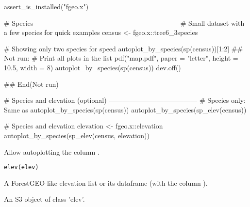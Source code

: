 \documentclass[a4paper]{book}
\begin{document}
%
\begin{Examples}
\begin{ExampleCode}
assert_is_installed("fgeo.x")

# Species ---------------------------------------------------------------
# Small dataset with a few species for quick examples
census <- fgeo.x::tree6_3species

# Showing only two species for speed
autoplot_by_species(sp(census))[1:2]
## Not run: 
# Print all plots in the list
pdf("map.pdf", paper = "letter", height = 10.5, width = 8)
autoplot_by_species(sp(census))
dev.off()

## End(Not run)

# Species and elevation (optional) ---------------------------------------
# Species only: Same as autoplot_by_species(sp(census))
autoplot_by_species(sp_elev(census))

# Species and elevation
elevation <- fgeo.x::elevation
autoplot_by_species(sp_elev(census, elevation))
\end{ExampleCode}
\end{Examples}
%
\begin{Description}\relax
Allow autoplotting the column .
\end{Description}
%
\begin{Usage}
\begin{verbatim}
elev(elev)
\end{verbatim}
\end{Usage}
%
\begin{Arguments}
\begin{ldescription}
\item[\code{elev}] A ForestGEO-like elevation list or its  dataframe (with
the column ).
\end{ldescription}
\end{Arguments}
%
\begin{Value}
An S3 object of class 'elev'.
\end{Value}
%
\end{document}
